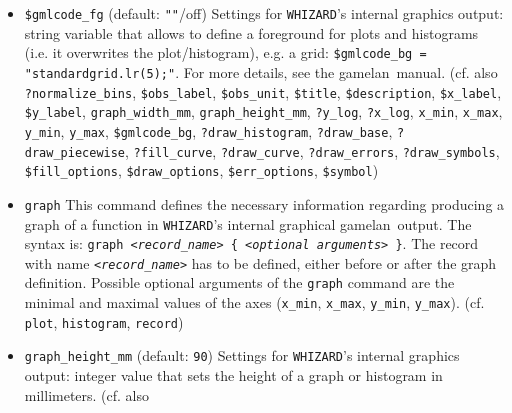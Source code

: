 \documentclass[12pt]{book}
\newcommand{\ttt}[1]{\texttt{#1}}
\newcommand{\whizard}{\texttt{WHIZARD}}
\newcommand{\gamelan}{\textsf{gamelan}}
\begin{document}
\begin{itemize}
\gamelan\ manual. (cf. also
\ttt{?normalize\_bins}, \ttt{\$obs\_label}, \ttt{\$obs\_unit},
\ttt{\$title}, \ttt{\$description}, \ttt{\$x\_label},
\ttt{\$y\_label}, \ttt{graph\_width\_mm}, \ttt{graph\_height\_mm}, 
\ttt{?y\_log}, \ttt{?x\_log}, \ttt{x\_min}, \ttt{x\_max},
\ttt{y\_min}, \ttt{y\_max}, \ttt{\$gmlcode\_fg},
\ttt{?draw\_histogram}, \ttt{?draw\_base}, \ttt{?draw\_piecewise},
\newline \ttt{?fill\_curve}, \ttt{?draw\_curve}, \ttt{?draw\_errors},
\ttt{?draw\_symbols}, \ttt{\$fill\_options}, \newline \ttt{\$draw\_options},
\ttt{\$err\_options}, \ttt{\$symbol})
\item
\ttt{\$gmlcode\_fg} \qquad (default: \ttt{""}/off) \newline
Settings for \whizard's internal graphics output: string variable that
allows to define a foreground for plots and histograms (i.e. it 
overwrites the plot/histogram), e.g. a grid: 
\ttt{\$gmlcode\_bg = "standardgrid.lr(5);"}. For more details, see the
\gamelan\ manual. (cf. also
\ttt{?normalize\_bins}, \ttt{\$obs\_label}, \ttt{\$obs\_unit},
\ttt{\$title}, \ttt{\$description}, \ttt{\$x\_label},
\ttt{\$y\_label}, \ttt{graph\_width\_mm}, \ttt{graph\_height\_mm}, 
\ttt{?y\_log}, \ttt{?x\_log}, \ttt{x\_min}, \ttt{x\_max},
\ttt{y\_min}, \ttt{y\_max}, \ttt{\$gmlcode\_bg},
\ttt{?draw\_histogram}, \ttt{?draw\_base}, \ttt{?draw\_piecewise},
\newline \ttt{?fill\_curve}, \ttt{?draw\_curve}, \ttt{?draw\_errors},
\ttt{?draw\_symbols}, \ttt{\$fill\_options}, \newline \ttt{\$draw\_options},
\ttt{\$err\_options}, \ttt{\$symbol})
\item
\ttt{graph} \newline
This command defines the necessary information regarding producing 
a graph of a function in \whizard's internal graphical \gamelan\
output. The syntax is: \ttt{graph {\em <record\_name>} \{ {\em <optional 
arguments>} \}}. The record with name \ttt{{\em <record\_name>}} has to be
defined, either before or after the graph definition. Possible optional
arguments of the \ttt{graph} command are the minimal and maximal values
of the axes (\ttt{x\_min}, \ttt{x\_max}, \ttt{y\_min}, \ttt{y\_max}). 
(cf. \ttt{plot}, \ttt{histogram}, \ttt{record})
\item
\ttt{graph\_height\_mm} \qquad (default: \ttt{90}) \newline
Settings for \whizard's internal graphics output: integer value that
sets the height of a graph or histogram in millimeters. (cf. also

\end{itemize}
\end{document}
